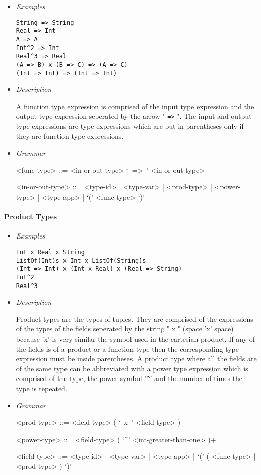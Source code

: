 \documentclass{article}
\begin{document}
\begin{itemize}
\item \textit{Examples}
\begin{verbatim}
String => String 
Real => Int
A => A
Int^2 => Int
Real^3 => Real
(A => B) x (B => C) => (A => C)
(Int => Int) => (Int => Int)
\end{verbatim}

\item \textit{Description}

A function type expression is comprised of the input type expression and the
output type expression seperated by the arrow " \texttt{=>} ". The input and output
type expressions are type expressions which are put in parentheses only if they are
function type expressions. 

\item \textit{Grammar}
\begin{grammar}
<func-type> ::= <in-or-out-type> `\ =>\ ' <in-or-out-type>

<in-or-out-type> ::=
<type-id> | <type-var> | <prod-type> | <power-type> | <type-app> |
`(' <func-type> `)'
\end{grammar}
\end{itemize}

\paragraph{Product Types}

\begin{itemize}
\item \textit{Examples}
\begin{verbatim}
Int x Real x String
ListOf(Int)s x Int x ListOf(String)s
(Int => Int) x (Int x Real) x (Real => String)
Int^2
Real^3
\end{verbatim}

\item \textit{Description}

Product types are the types of tuples. They are comprised of the expressions of
the types of the fields seperated by the string " x " (space 'x' space) because
'x' is very similar the symbol used in the cartesian product. If any of the
fields is of a product or a function type then the corresponding type expression
must be inside parentheses. A product type where all the fields are of the same
type can be abbreviated with a power type expression which is comprised of the 
type, the power symbol '\texttt{\^}' and the number of times the type is repeated.

\item \textit{Grammar}
\begin{grammar}
<prod-type> ::= <field-type> ( `\ x\ ' <field-type> )+

<power-type> ::= <field-type> ( `^' <int-greater-than-one> )+

<field-type> ::=
<type-id> | <type-var> | <type-app> | `(' ( <func-type> | <prod-type> ) `)'
\end{grammar}
\end{itemize}
\end{document}
